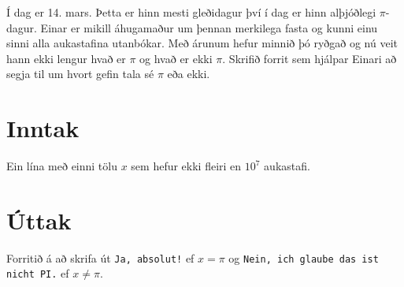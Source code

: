 \problemname{$\pi$}


Í dag er 14. mars. Þetta er hinn mesti gleðidagur því í dag er hinn alþjóðlegi $\pi$-dagur.
Einar er mikill áhugamaður um þennan merkilega fasta og kunni einu sinni alla aukastafina utanbókar.
Með árunum hefur minnið þó ryðgað og nú veit hann ekki lengur hvað er $\pi$ og hvað er ekki $\pi$.
Skrifið forrit sem hjálpar Einari að segja til um hvort gefin tala sé $\pi$ eða ekki.

\section*{Inntak}
Ein lína með einni tölu $x$ sem hefur ekki fleiri en $10^7$ aukastafi.

\section*{Úttak}
Forritið á að skrifa út \texttt{Ja, absolut!} ef $x = \pi$ og \texttt{Nein, ich glaube das ist nicht PI.} ef $x \neq \pi$.


